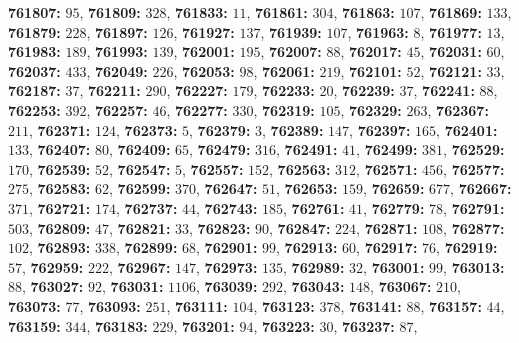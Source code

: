 \textsf{\bfseries 761807:} $95$, \textsf{\bfseries 761809:} $328$, \textsf{\bfseries 761833:} $11$, \textsf{\bfseries 761861:} $304$, \textsf{\bfseries 761863:} $107$, \textsf{\bfseries 761869:} $133$, \textsf{\bfseries 761879:} $228$, \textsf{\bfseries 761897:} $126$, \textsf{\bfseries 761927:} $137$, \textsf{\bfseries 761939:} $107$, \textsf{\bfseries 761963:} $8$, \textsf{\bfseries 761977:} $13$, \textsf{\bfseries 761983:} $189$, \textsf{\bfseries 761993:} $139$, \textsf{\bfseries 762001:} $195$, \textsf{\bfseries 762007:} $88$, \textsf{\bfseries 762017:} $45$, \textsf{\bfseries 762031:} $60$, \textsf{\bfseries 762037:} $433$, \textsf{\bfseries 762049:} $226$, \textsf{\bfseries 762053:} $98$, \textsf{\bfseries 762061:} $219$, \textsf{\bfseries 762101:} $52$, \textsf{\bfseries 762121:} $33$, \textsf{\bfseries 762187:} $37$, \textsf{\bfseries 762211:} $290$, \textsf{\bfseries 762227:} $179$, \textsf{\bfseries 762233:} $20$, \textsf{\bfseries 762239:} $37$, \textsf{\bfseries 762241:} $88$, \textsf{\bfseries 762253:} $392$, \textsf{\bfseries 762257:} $46$, \textsf{\bfseries 762277:} $330$, \textsf{\bfseries 762319:} $105$, \textsf{\bfseries 762329:} $263$, \textsf{\bfseries 762367:} $211$, \textsf{\bfseries 762371:} $124$, \textsf{\bfseries 762373:} $5$, \textsf{\bfseries 762379:} $3$, \textsf{\bfseries 762389:} $147$, \textsf{\bfseries 762397:} $165$, \textsf{\bfseries 762401:} $133$, \textsf{\bfseries 762407:} $80$, \textsf{\bfseries 762409:} $65$, \textsf{\bfseries 762479:} $316$, \textsf{\bfseries 762491:} $41$, \textsf{\bfseries 762499:} $381$, \textsf{\bfseries 762529:} $170$, \textsf{\bfseries 762539:} $52$, \textsf{\bfseries 762547:} $5$, \textsf{\bfseries 762557:} $152$, \textsf{\bfseries 762563:} $312$, \textsf{\bfseries 762571:} $456$, \textsf{\bfseries 762577:} $275$, \textsf{\bfseries 762583:} $62$, \textsf{\bfseries 762599:} $370$, \textsf{\bfseries 762647:} $51$, \textsf{\bfseries 762653:} $159$, \textsf{\bfseries 762659:} $677$, \textsf{\bfseries 762667:} $371$, \textsf{\bfseries 762721:} $174$, \textsf{\bfseries 762737:} $44$, \textsf{\bfseries 762743:} $185$, \textsf{\bfseries 762761:} $41$, \textsf{\bfseries 762779:} $78$, \textsf{\bfseries 762791:} $503$, \textsf{\bfseries 762809:} $47$, \textsf{\bfseries 762821:} $33$, \textsf{\bfseries 762823:} $90$, \textsf{\bfseries 762847:} $224$, \textsf{\bfseries 762871:} $108$, \textsf{\bfseries 762877:} $102$, \textsf{\bfseries 762893:} $338$, \textsf{\bfseries 762899:} $68$, \textsf{\bfseries 762901:} $99$, \textsf{\bfseries 762913:} $60$, \textsf{\bfseries 762917:} $76$, \textsf{\bfseries 762919:} $57$, \textsf{\bfseries 762959:} $222$, \textsf{\bfseries 762967:} $147$, \textsf{\bfseries 762973:} $135$, \textsf{\bfseries 762989:} $32$, \textsf{\bfseries 763001:} $99$, \textsf{\bfseries 763013:} $88$, \textsf{\bfseries 763027:} $92$, \textsf{\bfseries 763031:} $1106$, \textsf{\bfseries 763039:} $292$, \textsf{\bfseries 763043:} $148$, \textsf{\bfseries 763067:} $210$, \textsf{\bfseries 763073:} $77$, \textsf{\bfseries 763093:} $251$, \textsf{\bfseries 763111:} $104$, \textsf{\bfseries 763123:} $378$, \textsf{\bfseries 763141:} $88$, \textsf{\bfseries 763157:} $44$, \textsf{\bfseries 763159:} $344$, \textsf{\bfseries 763183:} $229$, \textsf{\bfseries 763201:} $94$, \textsf{\bfseries 763223:} $30$, \textsf{\bfseries 763237:} $87$, 
